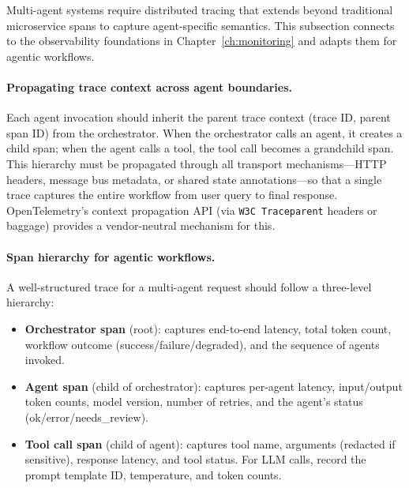 Multi-agent systems require distributed tracing that extends beyond traditional microservice spans to capture agent-specific semantics. This subsection connects to the observability foundations in Chapter~\ref{ch:monitoring} and adapts them for agentic workflows.

\paragraph{Propagating trace context across agent boundaries.}
Each agent invocation should inherit the parent trace context (trace ID, parent span ID) from the orchestrator. When the orchestrator calls an agent, it creates a child span; when the agent calls a tool, the tool call becomes a grandchild span. This hierarchy must be propagated through all transport mechanisms---HTTP headers, message bus metadata, or shared state annotations---so that a single trace captures the entire workflow from user query to final response. OpenTelemetry's context propagation API (via \texttt{W3C Traceparent} headers or baggage) provides a vendor-neutral mechanism for this.

\paragraph{Span hierarchy for agentic workflows.}
A well-structured trace for a multi-agent request should follow a three-level hierarchy:
\begin{itemize}[leftmargin=1.5em, itemsep=2pt]
  \item \textbf{Orchestrator span} (root): captures end-to-end latency, total token count, workflow outcome (success/failure/degraded), and the sequence of agents invoked.
  \item \textbf{Agent span} (child of orchestrator): captures per-agent latency, input/output token counts, model version, number of retries, and the agent's status (ok/error/needs\_review).
  \item \textbf{Tool call span} (child of agent): captures tool name, arguments (redacted if sensitive), response latency, and tool status. For LLM calls, record the prompt template ID, temperature, and token counts.
\end{itemize}

